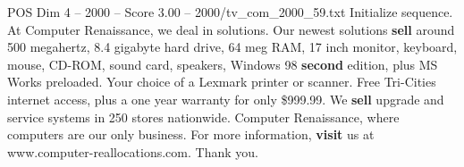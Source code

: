 \begin{textsample}{POS Dim 4 – 2000 – Score 3.00 – 2000/tv\_com\_2000\_59.txt}  \label{ex:f4_pos_071}
Initialize sequence.
At Computer Renaissance, we deal in solutions.
Our newest solutions \textbf{sell} around 500 megahertz, 8.4 gigabyte hard drive, 64 meg RAM, 17 inch monitor, keyboard, mouse, CD-ROM, sound card, speakers, Windows 98 \textbf{second} edition, plus MS Works preloaded.
Your choice of a Lexmark printer or scanner.
Free Tri-Cities internet access, plus a one year warranty for only \$999.99.
We \textbf{sell} upgrade and service systems in 250 stores nationwide.
Computer Renaissance, where computers are our only business.
For more information, \textbf{visit} us at www.computer-reallocations.com.
Thank you.

\end{textsample}
